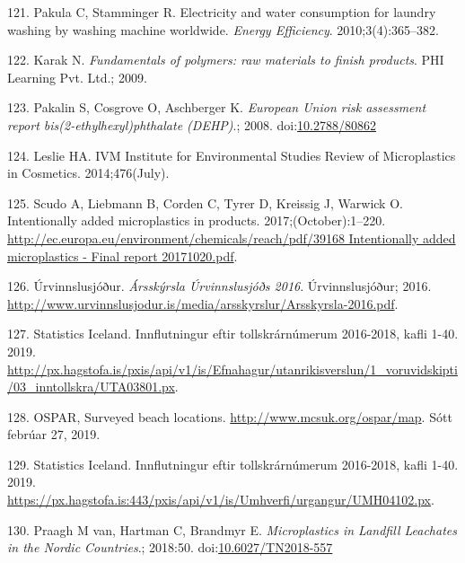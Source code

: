 \documentclass[icelandic,]{book}
\begin{document}
\leavevmode\hypertarget{ref-pakula2010electricity}{}%
121. Pakula C, Stamminger R. Electricity and water consumption for laundry washing by washing machine worldwide. \emph{Energy Efficiency}. 2010;3(4):365--382.

\leavevmode\hypertarget{ref-karak2009fundamentals}{}%
122. Karak N. \emph{Fundamentals of polymers: raw materials to finish products}. PHI Learning Pvt. Ltd.; 2009.

\leavevmode\hypertarget{ref-Pakalin2008}{}%
123. Pakalin S, Cosgrove O, Aschberger K. \emph{European Union risk assessment report bis(2-ethylhexyl)phthalate (DEHP)}.; 2008. doi:\href{https://doi.org/10.2788/80862}{10.2788/80862}

\leavevmode\hypertarget{ref-Leslie2014}{}%
124. Leslie HA. IVM Institute for Environmental Studies Review of Microplastics in Cosmetics. 2014;476(July).

\leavevmode\hypertarget{ref-Scudo2017}{}%
125. Scudo A, Liebmann B, Corden C, Tyrer D, Kreissig J, Warwick O. Intentionally added microplastics in products. 2017;(October):1--220. \href{http://ec.europa.eu/environment/chemicals/reach/pdf/39168\%20Intentionally\%20added\%20microplastics\%20-\%20Final\%20report\%2020171020.pdf}{http://ec.europa.eu/environment/chemicals/reach/pdf/39168 Intentionally added microplastics - Final report 20171020.pdf}.

\leavevmode\hypertarget{ref-Urvinnslusjouxf0ur2016}{}%
126. Úrvinnslusjóður. \emph{Ársskýrsla Úrvinnslusjóðs 2016}. Úrvinnslusjóður; 2016. \url{http://www.urvinnslusjodur.is/media/arsskyrslur/Arsskyrsla-2016.pdf}.

\leavevmode\hypertarget{ref-tollurinn}{}%
127. Statistics Iceland. Innflutningur eftir tollskrárnúmerum 2016-2018, kafli 1-40. 2019. \url{http://px.hagstofa.is/pxis/api/v1/is/Efnahagur/utanrikisverslun/1_voruvidskipti/03_inntollskra/UTA03801.px}.

\leavevmode\hypertarget{ref-ospar2019}{}%
128. OSPAR, Surveyed beach locations. \url{http://www.mcsuk.org/ospar/map}. Sótt febrúar 27, 2019.

\leavevmode\hypertarget{ref-tollurinn2}{}%
129. Statistics Iceland. Innflutningur eftir tollskrárnúmerum 2016-2018, kafli 1-40. 2019. \url{https://px.hagstofa.is:443/pxis/api/v1/is/Umhverfi/urgangur/UMH04102.px}.

\leavevmode\hypertarget{ref-Praagh1277395}{}%
130. Praagh M van, Hartman C, Brandmyr E. \emph{Microplastics in Landfill Leachates in the Nordic Countries}.; 2018:50. doi:\href{https://doi.org/10.6027/TN2018-557}{10.6027/TN2018-557}
\end{document}

